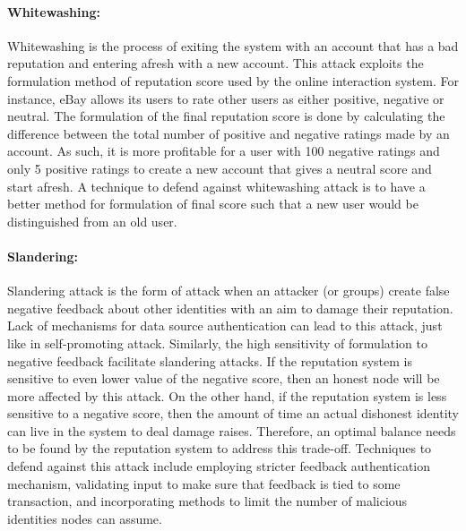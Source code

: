 \paragraph{Whitewashing:}Whitewashing is the process of exiting the system with
an account that has a bad reputation and entering afresh with a new account.
This attack exploits the formulation method of reputation score used by the
online interaction system. For instance, eBay allows its users to rate other
users as either positive, negative or neutral. The formulation of the final
reputation score is done by calculating the difference between the total number
of positive and negative ratings made by an account. As such, it is more
profitable for a user with 100 negative ratings and only 5 positive ratings to
create a new account that gives a neutral score and start afresh. A technique
to defend against whitewashing attack is to have a better method for
formulation of final score such that a new user would be distinguished from an
old user.  
\paragraph{Slandering:} Slandering attack is the form of attack when an
attacker (or groups) create false negative feedback about other identities with
an aim to damage their reputation. Lack of mechanisms for data source
authentication can lead to this attack, just like in self-promoting attack.
Similarly, the high sensitivity of formulation to negative feedback facilitate
slandering attacks. If the reputation system is sensitive to even lower value
of the negative score, then an honest node will be more affected by this
attack. On the other hand, if the reputation system is less sensitive to a
negative score, then the amount of time an actual dishonest identity can live
in the system to deal damage raises. Therefore, an optimal balance needs to be
found by the reputation system to address this trade-off. Techniques to defend
against this attack include employing stricter feedback authentication
mechanism, validating input to make sure that feedback is tied to some
transaction, and incorporating methods to limit the number of malicious
identities nodes can assume.
